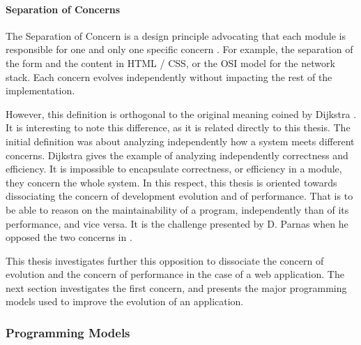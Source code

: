 
\paragraph{Separation of Concerns}

The Separation of Concern is a design principle advocating that each module is responsible for one and only one specific concern \cite{Tarr1999,Hursch1995}.
For example, the separation of the form and the content in HTML / CSS, or the OSI model for the network stack.
Each concern evolves independently without impacting the rest of the implementation.

However, this definition is orthogonal to the original meaning coined by Dijkstra \cite{Dijkstra1982}.
It is interesting to note this difference, as it is related directly to this thesis.
The initial definition was about analyzing independently how a system meets different concerns.
Dijkstra gives the example of analyzing independently correctness and efficiency.
It is impossible to encapsulate correctness, or efficiency in a module, they concern the whole system.
In this respect, this thesis is oriented towards dissociating the concern of development evolution and of performance.
That is to be able to reason on the maintainability of a program, independently than of its performance, and vice versa.
It is the challenge presented by D. Parnas when he opposed the two concerns in \cite{Parnas1972}.

This thesis investigates further this opposition to dissociate the concern of evolution and the concern of performance in the case of a web application.
The next section investigates the first concern, and presents the major programming models used to improve the evolution of an application.

\subsubsection{Programming Models} \label{chapter3:software-design:programming-models}


